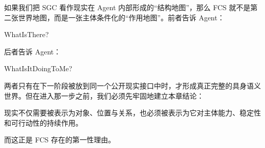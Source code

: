 如果我们把 SGC 看作现实在 Agent 内部形成的“结构地图”，那么 FCS 就不是第二张世界地图，而是一张主体条件化的“作用地图”。前者告诉 Agent：
\begin{statementbox}
WhatIsThere?
\end{statementbox}
后者告诉 Agent：
\begin{statementbox}
WhatIsItDoingToMe?
\end{statementbox}

两者只有在下一阶段被放到同一个公开现实接口中时，才形成真正完整的具身语义世界。但在进入那一步之前，我们必须先牢固地建立本章结论：

\begin{conclusion}
现实不仅需要被表示为对象、位置与关系，也必须被表示为它对主体能力、稳定性和可行动性的持续作用。
\end{conclusion}

而这正是 FCS 存在的第一性理由。
